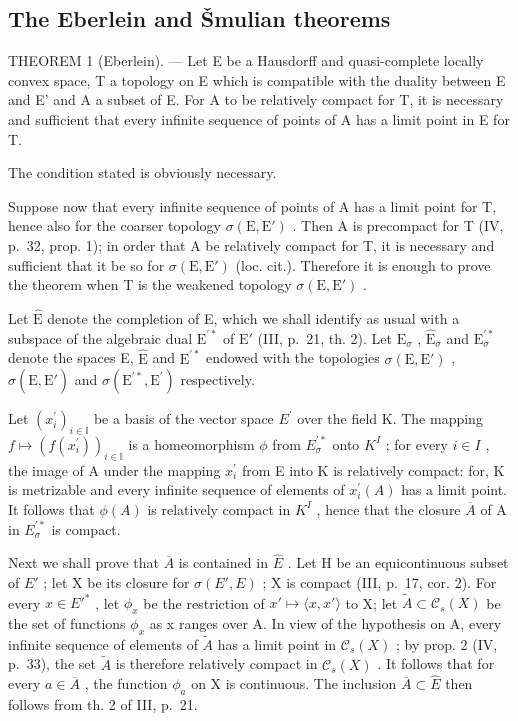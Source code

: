 \subsection{The Eberlein and Šmulian theorems}

THEOREM 1 (Eberlein). --- Let E be a Hausdorff and quasi-complete locally convex space, T a topology on E which is compatible with the duality between E and E' and A a subset of E. For A to be relatively compact for T, it is necessary and sufficient that every infinite sequence of points of A has a limit point in E for T.

The condition stated is obviously necessary.

Suppose now that every infinite sequence of points of A has a limit point for T, hence also for the coarser topology \(\sigma(\mathrm{E}, \mathrm{E}')\) . Then A is precompact for T (IV, p.~32, prop. 1); in order that A be relatively compact for T, it is necessary and sufficient that it be so for \(\sigma(\mathrm{E}, \mathrm{E}')\) (loc. cit.). Therefore it is enough to prove the theorem when T is the weakened topology \(\sigma(\mathrm{E}, \mathrm{E}')\) .

Let \(\hat{\mathrm{E}}\) denote the completion of E, which we shall identify as usual with a subspace of the algebraic dual \(\mathrm{E}^{\prime *}\) of \(\mathrm{E}'\) (III, p.~21, th. 2). Let \(\mathrm{E}_{\sigma}\) , \(\hat{\mathrm{E}}_{\sigma}\) and \(\mathrm{E}_{\sigma}^{\prime *}\) denote the spaces E, \(\hat{\mathrm{E}}\) and \(\mathrm{E}^{\prime *}\) endowed with the topologies \(\sigma (\mathrm{E},\mathrm{E}')\) , \(\sigma (\hat{\mathrm{E}},\mathrm{E}')\) and \(\sigma (\mathrm{E}^{\prime *},\mathrm{E}^{\prime})\) respectively.

Let \((x_{i}^{\prime})_{i\in\mathbb{I}}\) be a basis of the vector space \(E^{\prime}\) over the field K. The mapping \(f\mapsto(f(x_{i}^{\prime}))_{i\in\mathbb{I}}\) is a homeomorphism \(\phi\) from \(E_{\sigma}^{\prime*}\) onto \(K^{I}\) ; for every \(i\in I\) , the image of A under the mapping \(x_{i}^{\prime}\) from E into K is relatively compact: for, K is metrizable and every infinite sequence of elements of \(x_{i}^{\prime}(A)\) has a limit point. It follows that \(\phi(A)\) is relatively compact in \(K^{I}\) , hence that the closure \(\overline{A}\) of A in \(E_{\sigma}^{\prime*}\) is compact.

Next we shall prove that \(\overline{A}\) is contained in \(\hat{E}\) . Let H be an equicontinuous subset of \(E'\) ; let X be its closure for \(\sigma(E', E)\) ; X is compact (III, p.~17, cor. 2). For every \(x \in E'^{*}\) , let \(\phi_{x}\) be the restriction of \(x' \mapsto \langle x, x' \rangle\) to X; let \(\tilde{A} \subset \mathcal{C}_{s}(X)\) be the set of functions \(\phi_{x}\) as x ranges over A. In view of the hypothesis on A, every infinite sequence of elements of \(\tilde{A}\) has a limit point in \(\mathcal{C}_{s}(X)\) ; by prop. 2 (IV, p.~33), the set \(\tilde{A}\) is therefore relatively compact in \(\mathcal{C}_{s}(X)\) . It follows that for every \(a \in \overline{A}\) , the function \(\phi_{a}\) on X is continuous. The inclusion \(\overline{A} \subset \hat{E}\) then follows from th. 2 of III, p.~21.

